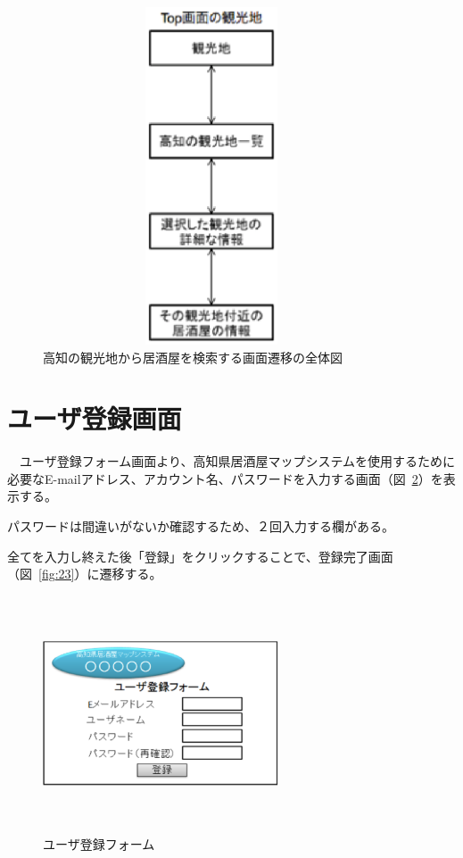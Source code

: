 \begin {figure}[!htbp]
    \begin{center}
    \includegraphics [height=10cm, width=10cm]{21.eps}
    \caption {高知の観光地から居酒屋を検索する画面遷移の全体図}
    \label {fig:21}
    \end{center}
\end {figure}

\clearpage

\section{ユーザ登録画面}
　ユーザ登録フォーム画面より、高知県居酒屋マップシステムを使用するために必要なE-mailアドレス、アカウント名、パスワードを入力する画面（図~\ref{fig:22}）を表示する。



パスワードは間違いがないか確認するため、２回入力する欄がある。



全てを入力し終えた後「登録」をクリックすることで、登録完了画面（図~\ref{fig:23}）に遷移する。




\begin {figure}[!htbp]
    \begin{center}
    \includegraphics [height=7cm, width=7cm]{22.eps}
    \caption {ユーザ登録フォーム}
    \label {fig:22}
    \end{center}
\end {figure}



